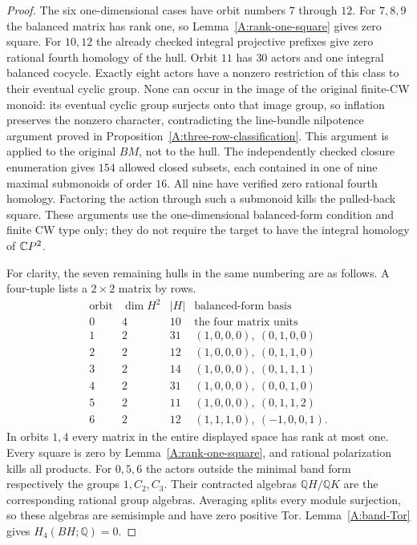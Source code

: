 \begin{proof}
The six one-dimensional cases have orbit numbers $7$ through $12$.
For $7,8,9$ the balanced matrix has rank one, so
Lemma~\ref{A:rank-one-square} gives zero square. For $10,12$ the
already checked integral projective prefixes give zero rational
fourth homology of the hull. Orbit $11$ has $30$ actors and one
integral balanced cocycle. Exactly eight actors have a nonzero
restriction of this class to their eventual cyclic group. None
can occur in the image of the original finite-CW monoid: its
eventual cyclic group surjects onto that image group, so inflation
preserves the nonzero character, contradicting the line-bundle
nilpotence argument proved in Proposition~\ref{A:three-row-classification}.
This argument is applied to the original $BM$, not to the hull.
The independently checked closure enumeration gives $154$ allowed
closed subsets, each contained in one of nine maximal submonoids
of order $16$. All nine have verified zero rational fourth
homology. Factoring the action through such a submonoid kills
the pulled-back square. These arguments use the one-dimensional
balanced-form condition and finite CW type only; they do not
require the target to have the integral homology of $\mathbb{C}P^2$.

For clarity, the seven remaining hulls in the same numbering are
as follows. A four-tuple lists a $2\times2$ matrix by rows.
\[
\begin{array}{c|r|r|l}
\text{orbit}&\dim H^2&|H|&\text{balanced-form basis}\\\hline
0&4&10&\text{the four matrix units}\\
1&2&31&(1,0,0,0),\ (0,1,0,0)\\
2&2&12&(1,0,0,0),\ (0,1,1,0)\\
3&2&14&(1,0,0,0),\ (0,1,1,1)\\
4&2&31&(1,0,0,0),\ (0,0,1,0)\\
5&2&11&(1,0,0,0),\ (0,1,1,2)\\
6&2&12&(1,1,1,0),\ (-1,0,0,1).
\end{array}
\]
In orbits $1,4$ every matrix in the entire displayed space has
rank at most one. Every square is zero by
Lemma~\ref{A:rank-one-square}, and rational polarization kills
all products. For $0,5,6$ the actors outside the minimal band
form respectively the groups $1,C_2,C_3$. Their contracted
algebras $\mathbb QH/\mathbb QK$ are the corresponding rational
group algebras. Averaging splits every module surjection, so
these algebras are semisimple and have zero positive Tor.
Lemma~\ref{A:band-Tor} gives $H_4(BH;\mathbb Q)=0$.


\end{proof}
